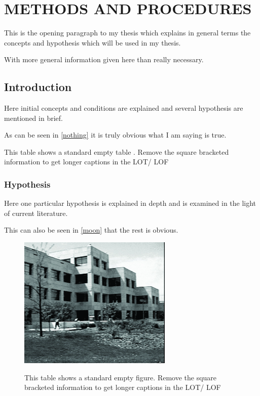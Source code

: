 \chapter{METHODS AND PROCEDURES}

This is the opening paragraph to my thesis which
explains in general terms the concepts and hypothesis
which will be used in my thesis.

With more general information given here than really
necessary.

\section{Introduction}

Here initial concepts and conditions are explained and
several hypothesis are mentioned in brief.

As can be seen in \autoref{nothing} it is truly
obvious what I am saying is true.

\begin{table}[h!tb] \centering

\caption[Short caption for List of Figures/ Tables]{This table shows a standard empty table\autocite{kleeHellyTheoremIts1963} . Remove the square bracketed information to get longer captions in the LOT/ LOF }
\label{nothing}

\vspace{ 2 in}
\end{table}

\subsection{Hypothesis}

Here one particular hypothesis is explained in depth
and is examined in the light of current literature.

This can also be seen in \autoref{moon} that the
rest is obvious.

\begin{figure}[h!tb] \centering

\includegraphics[alt={Alt text describing}]{Images/dc5.jpg}
\caption[Short caption for List of Figures/ Tables]{This table shows a standard empty figure. Remove the square bracketed information to get longer captions in the LOT/ LOF}
\label{moon}
\end{figure}

